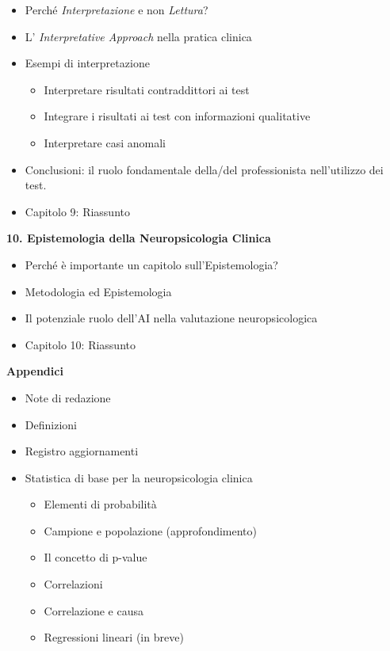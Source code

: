 \documentclass[
  italian,
  letterpaper,
  paper=6in:9in,
  pagesize=pdftex,
  headinclude=on,
  footinclude=on,
  11pt]{scrbook}
\providecommand{\tightlist}{%
  \setlength{\itemsep}{0pt}\setlength{\parskip}{0pt}}
\begin{document}
\begin{itemize}
\tightlist
\item
  Perché \emph{Interpretazione} e non \emph{Lettura}?
\item
  L' \emph{Interpretative Approach} nella pratica clinica
\item
  Esempi di interpretazione

  \begin{itemize}
  \tightlist
  \item
    Interpretare risultati contraddittori ai test
  \item
    Integrare i risultati ai test con informazioni qualitative
  \item
    Interpretare casi anomali
  \end{itemize}
\item
  Conclusioni: il ruolo fondamentale della/del professionista
  nell'utilizzo dei test.
\item
  Capitolo 9: Riassunto
\end{itemize}

\textbf{10. Epistemologia della Neuropsicologia Clinica}

\begin{itemize}
\tightlist
\item
  Perché è importante un capitolo sull'Epistemologia?
\item
  Metodologia ed Epistemologia
\item
  Il potenziale ruolo dell'AI nella valutazione neuropsicologica
\item
  Capitolo 10: Riassunto
\end{itemize}

\textbf{Appendici}

\begin{itemize}
\tightlist
\item
  Note di redazione
\item
  Definizioni
\item
  Registro aggiornamenti
\item
  Statistica di base per la neuropsicologia clinica

  \begin{itemize}
  \tightlist
  \item
    Elementi di probabilità
  \item
    Campione e popolazione (approfondimento)
  \item
    Il concetto di p-value
  \item
    Correlazioni
  \item
    Correlazione e causa
  \item
    Regressioni lineari (in breve)
  \end{itemize}
\end{itemize}
\end{document}
